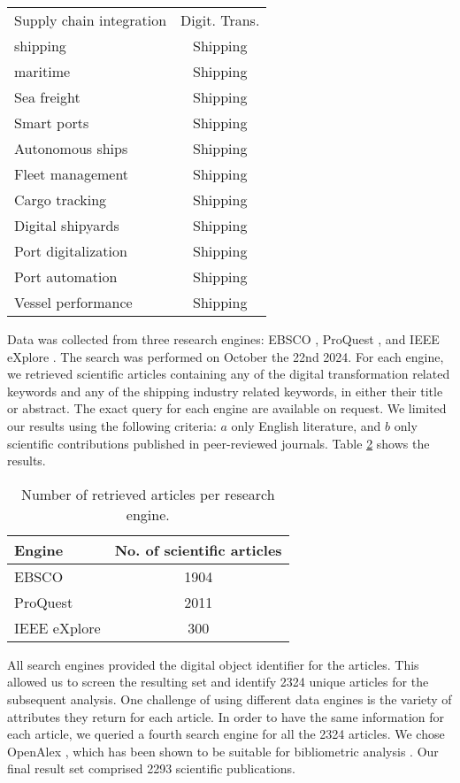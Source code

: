 \documentclass[a4paper, review, endfloat, authoryear]{elsarticle}
\begin{document}
\begin{table}[h]
\begin{tabular}{l c}
			Supply chain integration & Digit. Trans. \\
			shipping & Shipping \\
			maritime & Shipping \\
			Sea freight & Shipping \\
			Smart ports & Shipping \\
			Autonomous ships & Shipping \\
			Fleet management & Shipping \\
			Cargo tracking & Shipping \\
			Digital shipyards & Shipping \\
			Port digitalization & Shipping \\
			Port automation & Shipping \\
			Vessel performance & Shipping \\
			\hline
		\end{tabular}
		\label{tab:keywords}
	\end{table}
	
	Data was collected from three research engines: EBSCO \citep{vaughan2011ebsco}, ProQuest \citep{cooke2017proquest}, and IEEE eXplore \citep{wilde2016ieee}. The search was performed on October the 22nd 2024. For each engine, we retrieved scientific articles containing any of the digital transformation related keywords and any of the shipping industry related keywords, in either their title or abstract. The exact query for each engine are available on request. We limited our results using the following criteria: \(a\) only English literature, and \(b\) only scientific contributions published in peer-reviewed journals. Table \ref{tab:searchres} shows the results.
	
	\begin{table}[h]
		\centering
		\caption{Number of retrieved articles per research engine.}
		\begin{tabular}{l c}
			\hline
			Engine & No. of scientific articles \\
			\hline
			EBSCO & 1904 \\
			ProQuest & 2011 \\
			IEEE eXplore & 300 \\
			\hline
		\end{tabular}
		\label{tab:searchres}
	\end{table}
	
	All search engines provided the digital object identifier for the articles. This allowed us to screen the resulting set and identify 2324 unique articles for the subsequent analysis. One challenge of using different data engines is the variety of attributes they return for each article. In order to have the same information for each article, we queried a fourth search engine for all the 2324 articles. We chose OpenAlex \citep{priem2022openalex}, which has been shown to be suitable for bibliometric analysis \citep{alperin2024analysis}. Our final result set comprised 2293 scientific publications.
	
\end{document}
